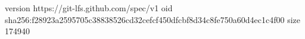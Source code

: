 version https://git-lfs.github.com/spec/v1
oid sha256:f28923a2595705c38838526cd32cefcf450dfcbf8d34c8fe750a60d4ec1c4f00
size 174940
